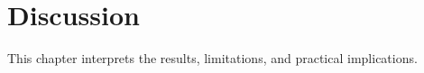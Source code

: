 \chapter{Discussion}

This chapter interprets the results, limitations, and practical implications.

